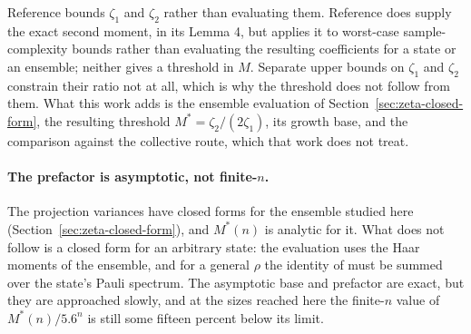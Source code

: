 Reference \cite{elben2020mixed} bounds \(\zeta_1\) and \(\zeta_2\) rather
than evaluating them. Reference \cite{huang2020shadows} does supply the
exact second moment, in its Lemma 4, but applies it to worst-case
sample-complexity bounds rather than evaluating the resulting
coefficients for a state or an ensemble; neither gives a threshold in
\(M\). Separate upper bounds on \(\zeta_1\) and \(\zeta_2\) constrain
their ratio not at all, which is why the threshold does not follow from
them. What this work adds is the ensemble evaluation of
Section~\ref{sec:zeta-closed-form}, the resulting threshold
\(M^* = \zeta_2/(2\zeta_1)\), its growth base, and the comparison against
the collective route, which that work does not treat.



\paragraph{The prefactor is asymptotic, not finite-\(n\).}
The projection variances have closed forms for the ensemble studied here
(Section~\ref{sec:zeta-closed-form}), and \(M^*(n)\) is analytic for it.
What does not follow is a closed form for an arbitrary state: the
evaluation uses the Haar moments of the ensemble, and for a general
\(\rho\) the identity of \cite{huang2020shadows} must be summed over the
state's Pauli spectrum. The asymptotic base and prefactor are exact, but
they are approached slowly, and at the sizes reached here the finite-\(n\)
value of \(M^*(n)/5.6^n\) is still some fifteen percent below its limit.



